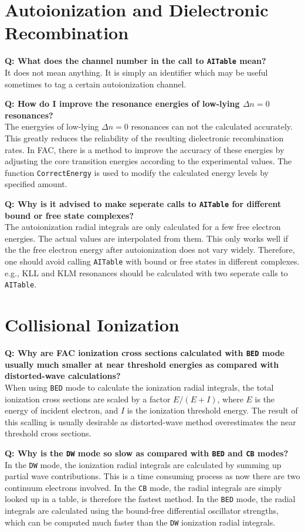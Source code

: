 \documentclass[twoside,letterpaper]{refrep}
\newcommand{\key}[1]{\texttt{#1}}
\newcounter{faq}[section]
\newcommand{\faq}[2]{\stepcounter{faq}
	\begin{minipage}{\textwidth}
	\textbf{Q\arabic{faq}: #1?}\\#2
	\end{minipage}}
\begin{document}
\section{Autoionization and Dielectronic Recombination}{
\faq{What does the channel number in the call to \key{AITable} mean}{
It does not mean anything. It is simply an identifier which may be useful
sometimes to tag a certain autoionization channel.}

\faq{How do I improve the resonance energies of low-lying $\Delta n = 0$
resonances}{
The energyies of low-lying $\Delta n = 0$ resonances can not the calculated
accurately. This greatly reduces the reliability of the resulting dielectronic
recombination rates. In FAC, there is a method to improve the accuracy of
these energies by adjusting the core transition energies according to the
experimental values. The function \key{CorrectEnergy} is used to modify the
calculated energy levels by specified amount.}

\faq{Why is it advised to make seperate calls to \key{AITable} for different
bound or free state complexes}{
The autoionization radial integrals are only calculated for a few free
electron energies. The actual values are interpolated from them. This only
works well if the the free electron energy after autoionization does not vary
widely. Therefore, one should avoid calling \key{AITable} with bound or free
states in different complexes. e.g., KLL and KLM resonances should be
calculated with two seperate calls to \key{AITable}.}

\section{Collisional Ionization}
\faq{Why are FAC ionization cross sections calculated with \key{BED} mode
usually much smaller at near threshold energies as compared with
distorted-wave calculations}{
When using \key{BED} mode to calculate the ionization radial integrals, the
total ionization cross sections are scaled by a factor $E/(E+I)$, where $E$ is
the energy of incident electron, and $I$ is the ionization threshold
energy. The result of this scalling is usually desirable as distorted-wave
method overestimates the near threshold cross sections.}

\faq{Why is the \key{DW} mode so slow as compared with \key{BED} and \key{CB}
modes}{
In the \key{DW} mode, the ionization radial integrals are calculated by
summing up partial wave contributions. This is a time consuming process as
now there are two continuum electrons involved. In the \key{CB} mode, the
radial integrals are simply looked up in a table, is therefore the fastest
method. In the \key{BED} mode, the radial integrals are calculated using the
bound-free differential oscillator strengths, which can be computed much
faster than the \key{DW} ionization radial integrals.}

}
\end{document}
